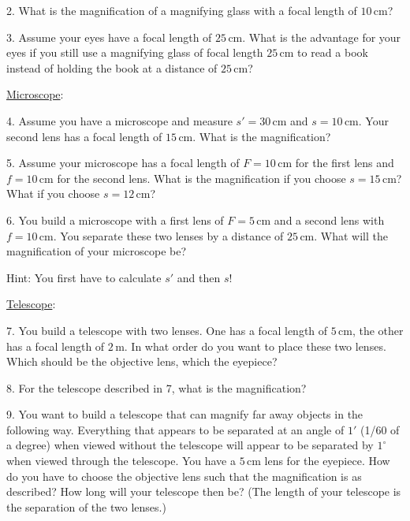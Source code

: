 2. What is the magnification of a magnifying glass with a focal length of $10\, \textrm{cm}$?\myskip

3. Assume your eyes have a focal length of $25\, \textrm{cm}$. What is the advantage for your eyes if you still use a magnifying glass of focal length $25\, \textrm{cm}$ to read a book instead of holding the book at a distance of $25\, \textrm{cm}$?\myskip

\noindent\underline{Microscope}:\myskip

4. Assume you have a microscope and measure $s' = 30\, \textrm{cm}$ and $s = 10\, \textrm{cm}$. Your second lens has a focal length of $15\, \textrm{cm}$. What is the magnification?\myskip

5. Assume your microscope has a focal length of $F = 10\, \textrm{cm}$ for the first lens and $f = 10\, \textrm{cm}$ for the second lens. What is the magnification if you choose $s = 15\, \textrm{cm}$? What if you choose $s = 12\, \textrm{cm}$?\myskip

6. You build a microscope with a first lens of $F = 5\, \textrm{cm}$ and a second lens with $f = 10\, \textrm{cm}$. You separate these two lenses by a distance of $25\, \textrm{cm}$. What will the magnification of your microscope be? \myskip

Hint: You first have to calculate $s'$ and then $s$!\myskip

\noindent\underline{Telescope}:\myskip

7. You build a telescope with two lenses. One has a focal length of $5\, \textrm{cm}$, the other has a focal length of $2\, \textrm{m}$. In what order do you want to place these two lenses. Which should be the objective lens, which the eyepiece? \myskip

8. For the telescope described in 7, what is the magnification?\myskip

9. You want to build a telescope that can magnify far away objects in the following way. Everything that appears to be separated at an angle of $1'$ (1/60 of a degree) when viewed without the telescope will appear to be separated by $1^\circ$ when viewed through the telescope. You have a $5\, \textrm{cm}$ lens for the eyepiece. How do you have to choose the objective lens such that the magnification is as described? How long will your telescope then be? (The length of your telescope is the separation of the two lenses.)
